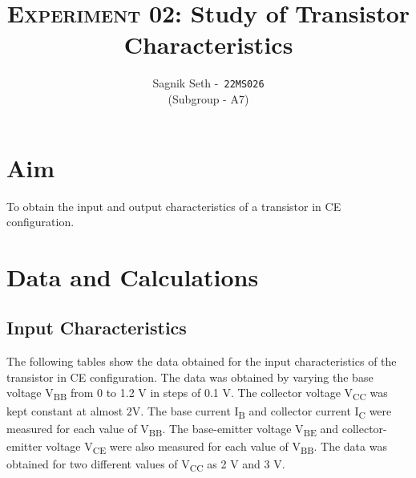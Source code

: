 \documentclass{scrartcl}
\title{
        \Large\textsc{Experiment 02: }
        \huge\textbf{Study of Transistor Characteristics} \\
}
\author{{\Large Sagnik Seth} -\   \texttt{22MS026}\\ ({\small Subgroup - A7}) }
\date{}
\begin{document}
\maketitle
\section{Aim}
To obtain the input and output characteristics of a transistor in CE configuration.
 
\section{Data and Calculations}
\subsection{Input Characteristics}
The following tables show the data obtained for the input characteristics of the transistor in CE configuration. The data was obtained by varying the base voltage V\textsubscript{BB} from 0 to 1.2 V in steps of 0.1 V. The collector voltage V\textsubscript{CC} was kept constant at almost $\mathrm{2 V}$. The base current I\textsubscript{B} and collector current I\textsubscript{C} were measured for each value of V\textsubscript{BB}. The base-emitter voltage V\textsubscript{BE} and collector-emitter voltage V\textsubscript{CE} were also measured for each value of V\textsubscript{BB}. The data was obtained for two different values of V\textsubscript{CC} as 2 V and 3 V. 
\end{document}
